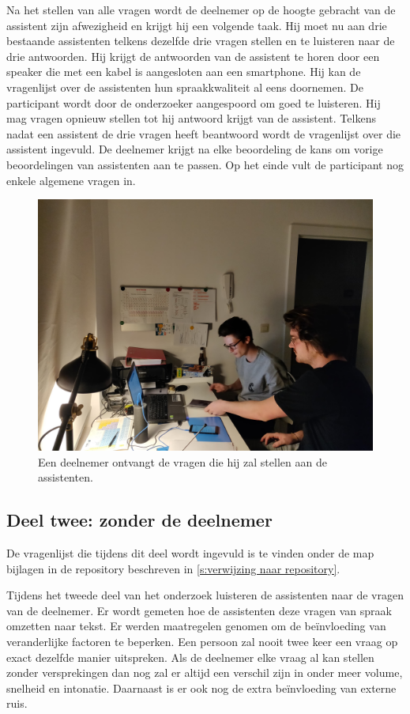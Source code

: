 Na het stellen van alle vragen wordt de deelnemer op de hoogte gebracht van de assistent zijn afwezigheid en krijgt hij een volgende taak. Hij moet nu aan drie bestaande assistenten telkens dezelfde drie vragen stellen en te luisteren naar de drie antwoorden. Hij krijgt de antwoorden van de assistent te horen door een speaker die met een kabel is aangesloten aan een smartphone. Hij kan de vragenlijst over de assistenten hun spraakkwaliteit al eens doornemen. De participant wordt door de onderzoeker aangespoord om goed te luisteren. Hij mag vragen opnieuw stellen tot hij antwoord krijgt van de assistent. Telkens nadat een assistent de drie vragen heeft beantwoord wordt de vragenlijst over die assistent ingevuld. De deelnemer krijgt na elke beoordeling de kans om vorige beoordelingen van assistenten aan te passen. Op het einde vult de participant nog enkele algemene vragen in.

\begin{figure}[h]
    \includegraphics[width=0.7\linewidth]{img/proefafname2}
    \caption{Een deelnemer ontvangt de vragen die hij zal stellen aan de assistenten.}
    \label{fig:proefafname1}
\end{figure}

\subsection{Deel twee: zonder de deelnemer}
De vragenlijst die tijdens dit deel wordt ingevuld is te vinden onder de map bijlagen in de repository beschreven in \ref{s:verwijzing naar repository}.

Tijdens het tweede deel van het onderzoek luisteren de assistenten naar de vragen van de deelnemer. Er wordt gemeten hoe de assistenten deze vragen van spraak omzetten naar tekst.
Er werden maatregelen genomen om de beïnvloeding van veranderlijke factoren te beperken. Een persoon zal nooit twee keer een vraag op exact dezelfde manier uitspreken. Als de deelnemer elke vraag al kan stellen zonder versprekingen dan nog zal er altijd een verschil zijn in onder meer volume, snelheid en intonatie. Daarnaast is er ook nog de extra beïnvloeding van externe ruis.

